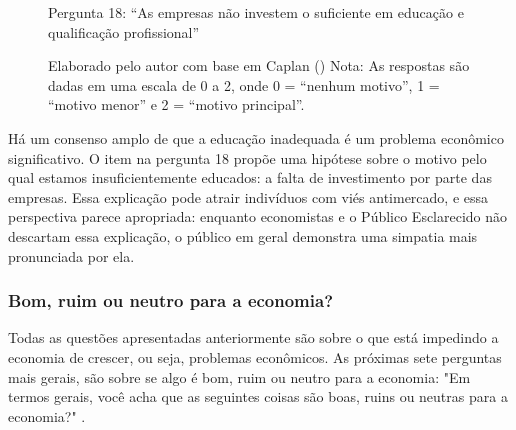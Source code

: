 \begin{figure}[H]
    \centering
    \caption*{Pergunta 18: “As empresas não investem o suficiente em educação e qualificação profissional”}
    \caption{Elaborado pelo autor com base em Caplan (\citeyear{The_Myth_of_the_Rational_Voter}) \newline
    Nota: As respostas são dadas em uma escala de 0 a 2, onde 0 = “nenhum motivo”, 1 = “motivo menor” e 2 = “motivo principal”.}
    \label{fig:pergunta_18}
\end{figure}

Há um consenso amplo de que a educação inadequada é um problema econômico significativo. O item na pergunta 18 propõe uma hipótese sobre o motivo pelo qual estamos insuficientemente educados: a falta de investimento por parte das empresas. Essa explicação pode atrair indivíduos com viés antimercado, e essa perspectiva parece apropriada: enquanto economistas e o Público Esclarecido não descartam essa explicação, o público em geral demonstra uma simpatia mais pronunciada por ela. 


\subsubsection{Bom, ruim ou neutro para a economia?}

Todas as questões apresentadas anteriormente são sobre o que está impedindo a economia de crescer, ou seja, problemas econômicos. As próximas sete perguntas mais gerais, são sobre se algo é bom, ruim ou neutro para a economia: "Em termos gerais, você acha que as seguintes coisas são boas, ruins ou neutras para a economia?" \cite{saee1996}.

